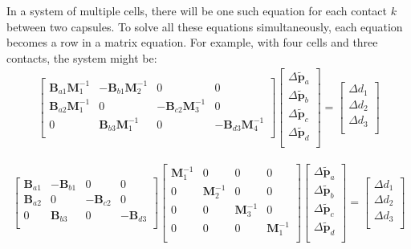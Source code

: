 \documentclass{report}
\renewcommand{\vec}[1]{\mathbf{#1}}
\newcommand{\mat}{\mathbf}
\newcommand{\Minv}{\mat{M}^{-1}}
\begin{document}
In a system of multiple cells, there will be one such equation for each contact $k$ between two capsules.
To solve all these equations simultaneously, each equation becomes a
row in a matrix equation.  For example, with four cells and
three contacts, the
system might be:
\begin{align*}
\left[
\begin{array}{llll}
\mat{B}_{a1}\Minv_1 & -\mat{B}_{b1}\Minv_2 & 0 & 0 \\
\mat{B}_{a2}\Minv_1 & 0 & -\mat{B}_{c2}\Minv_3 & 0 \\
0 & \mat{B}_{b3}\Minv_1 & 0 & -\mat{B}_{d3}\Minv_4 \\
\end{array}
\right]
\left[
\begin{array}{c}
\Delta\tilde{\vec{p}}_a\\
\Delta\tilde{\vec{p}}_b\\
\Delta\tilde{\vec{p}}_c\\
\Delta\tilde{\vec{p}}_d\\
\end{array}
\right]
=
\left[
\begin{array}{c}
\Delta d_1\\
\Delta d_2\\
\Delta d_3\\
\end{array}
\right]
\end{align*}

\begin{align*}
\left[
\begin{array}{llll}
\mat{B}_{a1} & -\mat{B}_{b1} & 0 & 0 \\
\mat{B}_{a2} & 0 & -\mat{B}_{c2} & 0 \\
0 & \mat{B}_{b3} & 0 & -\mat{B}_{d3} \\
\end{array}
\right]
\left[
\begin{array}{llll}
\Minv_1 & 0 & 0 & 0 \\
0 & \Minv_2 & 0 & 0 \\
0 & 0 & \Minv_3 & 0 \\
0 & 0 & 0 & \Minv_1  \\
\end{array}
\right]
\left[
\begin{array}{c}
\Delta\tilde{\vec{p}}_a\\
\Delta\tilde{\vec{p}}_b\\
\Delta\tilde{\vec{p}}_c\\
\Delta\tilde{\vec{p}}_d\\
\end{array}
\right]
=
\left[
\begin{array}{c}
\Delta d_1\\
\Delta d_2\\
\Delta d_3\\
\end{array}
\right]\\
\end{align*}
\end{document}
